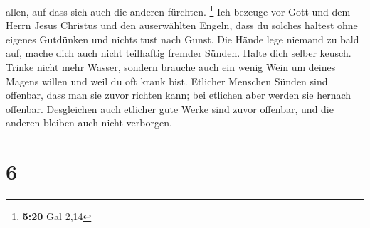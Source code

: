 allen, auf dass sich auch die anderen fürchten. \footnote{\textbf{5:20}
  Gal 2,14}  Ich bezeuge vor Gott und dem Herrn Jesus
Christus und den auserwählten Engeln, dass du solches haltest ohne
eigenes Gutdünken und nichts tust nach Gunst.  Die Hände
lege niemand zu bald auf, mache dich auch nicht teilhaftig fremder
Sünden. Halte dich selber keusch.  Trinke nicht mehr
Wasser, sondern brauche auch ein wenig Wein um deines Magens willen und
weil du oft krank bist.  Etlicher Menschen Sünden sind
offenbar, dass man sie zuvor richten kann; bei etlichen aber werden sie
hernach offenbar.  Desgleichen auch etlicher gute Werke
sind zuvor offenbar, und die anderen bleiben auch nicht verborgen.

\hypertarget{section-5}{%
\section{6}\label{section-5}}

